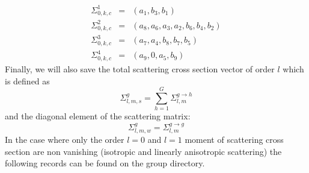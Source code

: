 \begin{eqnarray*}
\Sigma_{0,k,c}^{1}&=&\left(a_{1},b_{3},b_{1}\right) \\
\Sigma_{0,k,c}^{2}&=&\left(a_{8},a_{6},a_{3},a_{2},b_{6},b_{4},b_{2}\right) \\
\Sigma_{0,k,c}^{3}&=&\left(a_{7},a_{4},b_{8},b_{7},b_{5}\right) \\
\Sigma_{0,k,c}^{4}&=&\left(a_{9},0,a_{5},b_{9}\right) 
\end{eqnarray*}
Finally, we will also save the total scattering cross section vector of order
$l$ which is defined as 
  \begin{displaymath}
    \Sigma_{l,m,s}^{g}=\sum_{h=1}^{G} \Sigma_{l,m}^{g\to h}
  \end{displaymath}
and the diagonal element of the scattering matrix:
  \begin{displaymath}
    \Sigma_{l,m,w}^{g}=\Sigma_{l,m}^{g\to g}
  \end{displaymath}
In the case where only the order $l=0$ and $l=1$ moment of scattering cross section are non
vanishing (isotropic and linearly anisotropic scattering) the following records can be found on the
group directory.

